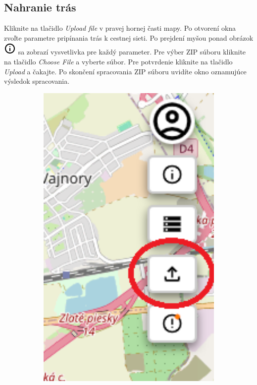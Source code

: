 \subsection{Nahranie trás}
Kliknite na tlačidlo \textit{Upload file} v pravej hornej časti mapy. Po otvorení okna zvoľte parametre pripínania trás k cestnej sieti. Po prejdení myšou ponad obrázok \includegraphics[scale=0.5]{img/icons/info.png} sa zobrazí vysvetlivka pre každý parameter. Pre výber ZIP súboru kliknite na tlačidlo \textit{Choose File} a vyberte súbor. Pre potvrdenie kliknite na tlačidlo \textit{Upload} a čakajte. Po skončení spracovania ZIP súboru uvidíte okno oznamujúce výsledok spracovania. 
\begin{figure}[H]
    \centering
    \begin{subfigure}{0.2\textwidth}
        \centering
        \includegraphics[width=1\textwidth]{guide_includes/img/upload_file_tool_button.png}

\end{subfigure}
\end{figure}
